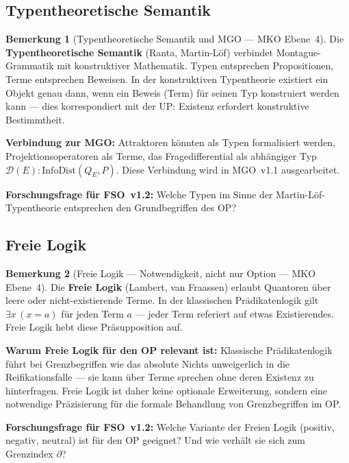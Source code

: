 \documentclass[11pt,a4paper]{article}
\theoremstyle{plain}
\theoremstyle{definition}
\newtheorem{remark}{Bemerkung}[section]
\begin{document}
\subsection{Typentheoretische Semantik}

\begin{remark}[Typentheoretische Semantik und MGO --- MKO Ebene~4]
Die \textbf{Typentheoretische Semantik} (Ranta, Martin-L\"{o}f) verbindet
Montague-Grammatik mit konstruktiver Mathematik. Typen entsprechen Propositionen,
Terme entsprechen Beweisen. In der konstruktiven Typentheorie existiert ein Objekt
genau dann, wenn ein Beweis (Term) f\"{u}r seinen Typ konstruiert werden kann ---
dies korrespondiert mit der UP: Existenz erfordert konstruktive Bestimmtheit.

\textbf{Verbindung zur MGO:} Attraktoren k\"{o}nnten als Typen formalisiert werden,
Projektionsoperatoren als Terme, das Fragedifferential als abh\"{a}ngiger Typ
$\mathcal{D}(E) : \mathrm{InfoDist}(Q_E, P)$. Diese Verbindung wird in MGO~v1.1
ausgearbeitet.

\textbf{Forschungsfrage f\"{u}r FSO~v1.2:} Welche Typen im Sinne der
Martin-L\"{o}f-Typentheorie entsprechen den Grundbegriffen des OP?
\end{remark}

\subsection{Freie Logik}

\begin{remark}[Freie Logik --- Notwendigkeit, nicht nur Option --- MKO Ebene~4]
Die \textbf{Freie Logik} (Lambert, van Fraassen) erlaubt Quantoren \"{u}ber leere
oder nicht-existierende Terme. In der klassischen Pr\"{a}dikatenlogik gilt
$\exists x\,(x=a)$ f\"{u}r jeden Term $a$ --- jeder Term referiert auf etwas
Existierendes. Freie Logik hebt diese Pr\"{a}supposition auf.

\textbf{Warum Freie Logik f\"{u}r den OP relevant ist:} Klassische Pr\"{a}dikatenlogik
f\"{u}hrt bei Grenzbegriffen wie \glqq{}das absolute Nichts\grqq{} unweigerlich in
die Reifikationsfalle --- sie kann \"{u}ber Terme sprechen ohne deren Existenz zu
hinterfragen. Freie Logik ist daher keine optionale Erweiterung, sondern eine
notwendige Pr\"{a}zisierung f\"{u}r die formale Behandlung von Grenzbegriffen im OP.

\textbf{Forschungsfrage f\"{u}r FSO~v1.2:} Welche Variante der Freien Logik
(positiv, negativ, neutral) ist f\"{u}r den OP geeignet? Und wie verh\"{a}lt sie
sich zum Grenzindex $\partial$?
\end{remark}
\end{document}
